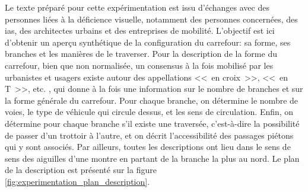 Le texte préparé pour cette expérimentation est issu d'échanges avec des personnes liées à la déficience visuelle, notamment des personnes concernées, des \glspl{ia}, des architectes urbains et des entreprises de mobilité. L'objectif est ici d'obtenir un aperçu synthétique de la configuration du carrefour: sa forme, ses branches et les manières de le traverser. Pour la description de la forme du carrefour, bien que non normalisée, un consensus à la fois mobilisé par les urbanistes et usagers existe autour des appellations <<~en croix~>>, <<~en T~>>, etc. \citep{fogliaroni2018}, qui donne à la fois une information sur le nombre de branches et sur la forme générale du carrefour. Pour chaque branche, on détermine le nombre de voies, le type de véhicule qui circule dessus, et les sens de circulation. Enfin, on détermine pour chaque branche s'il existe une traversée, c'est-à-dire la possibilité de passer d'un trottoir à l'autre, et on décrit l'accessibilité des passages piétons qui y sont associés. Par ailleurs, toutes les descriptions ont lieu dans le sens de sens des aiguilles d'une montre en partant de la branche la plus au nord. Le plan de la description est présenté sur la figure \ref{fig:experimentation_plan_description}.

